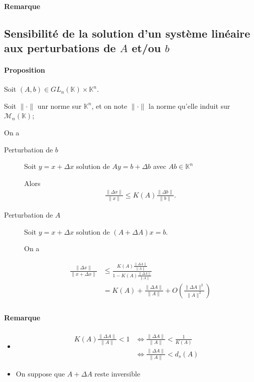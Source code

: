 \documentclass{article}
\newcommand{\cM}{\mathcal{M}}
\newcommand{\K}{\mathbb{K}}
\newenvironment{remarque}{
	\paragraph{Remarque}
}{}
\newenvironment{proposition}[1][\unskip]{
	\paragraph{Proposition #1}

}{}
\begin{document}
\begin{example}
\begin{remarque}
\end{remarque}

\subsection{Sensibilité de la solution d'un système linéaire aux perturbations de $A$ et/ou $b$}

\begin{proposition}
    Soit $(A, b) \in GL_n(\K) \times \K^{n}$.

    Soit $\| \cdot \|$ unr norme sur $\K^{n}$, et on note $\| \cdot \|$ la norme qu'elle induit sur $\cM_n(\K)$;

    On a
    \begin{description}
        \item[Perturbation de $b$] Soit $y = x+\Delta x$ solution de  $Ay = b + \Delta b$ avec  $A b \in \K^{n}$

            Alors \begin{align*}
                \frac{\|\Delta x\|}{\|x\|} \le K(A) \frac{\|\Delta b\|}{\|b\|}.
            \end{align*}
        \item[Perturbation de $A$] Soit $y = x+\Delta x$ solution de $(A + \Delta A)x = b$.

            On a 

            \begin{align*}
                \frac{\|\Delta x\|}{\|x + \Delta x\|} &\le \frac{K(A) \frac{\|\Delta A \|}{\|A\|}}{1 - K(A) \frac{\|\Delta A\|}{\|A\|}}  \\
                &= K(A) + \frac{\|\Delta A\|}{\|A\|} + O\left( \frac{\|\Delta A\|^2}{\|A\|^2} \right)  \\
            \end{align*}
    \end{description}
\end{proposition}

\begin{remarque}
    \begin{itemize}
        \item 
    \begin{align*}
        K(A) \frac{\|\Delta A\|}{\|A\|} < 1 &\iff \frac{\|\Delta A\|}{\|A\|} < \frac{1}{K(A)} \\
                                            &\iff \frac{\|\Delta A\|}{\|A\|} < d_s(A)
    \end{align*}
    \item On suppose que $A + \Delta A$ reste inversible
    \end{itemize}
\end{remarque}


\end{example}
\end{document}
